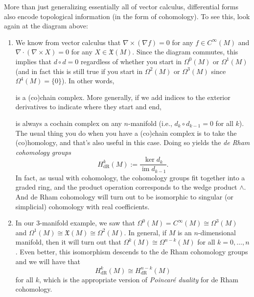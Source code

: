 More than just generalizing essentially all of vector calculus, differential forms also encode topological information (in the form of cohomology). To see this, look again at the diagram above:
\begin{enumerate}
	\item We know from vector calculus that $\nabla \times (\nabla f) = 0$ for any $f \in C^\infty(M)$ and $\nabla \cdot(\nabla \times X) = 0$ for any $X \in \mathfrak{X}(M)$. Since the diagram commutes, this implies that $d \circ d = 0$ regardless of whether you start in $\Omega^0(M)$ or $\Omega^1(M)$ (and in fact this is still true if you start in $\Omega^2(M)$ or $\Omega^3(M)$ since $\Omega^4(M) = \{0\}$). In other words,
	\begin{center}
	\end{center}
	is a (co)chain complex. More generally, if we add indices to the exterior derivatives to indicate where they start and end,
	\begin{center}
	\end{center}
	is always a cochain complex on any $n$-manifold (i.e., $d_k \circ d_{k-1} = 0$ for all $k$). The usual thing you do when you have a (co)chain complex is to take the (co)homology, and that's also useful in this case. Doing so yields the \emph{de Rham cohomology groups}
	\[
		H_{\text{dR}}^k(M) := \frac{\ker d_k}{\operatorname{im} d_{k-1}}.
	\]
	In fact, as usual with cohomology, the cohomology groups fit together into a graded ring, and the product operation corresponds to the wedge product $\wedge$. And de Rham cohomology will turn out to be isomorphic to singular (or simplicial) cohomology with real coefficients.
	
	\item In our 3-manifold example, we saw that $\Omega^0(M) = C^\infty(M) \cong \Omega^3(M)$ and $\Omega^1(M) \cong \mathfrak{X}(M) \cong \Omega^2(M)$. In general, if $M$ is an $n$-dimensional manifold, then it will turn out that $\Omega^k(M) \cong \Omega^{n-k}(M)$ for all $k=0, \dots , n$. Even better, this isomorphism descends to the de Rham cohomology groups and we will have that
	\[
		H_{\text{dR}}^k(M) \cong H_{\text{dR}}^{n-k}(M)
	\]
	for all $k$, which is the appropriate version of \emph{Poincaré duality} for de Rham cohomology.
	
\end{enumerate}